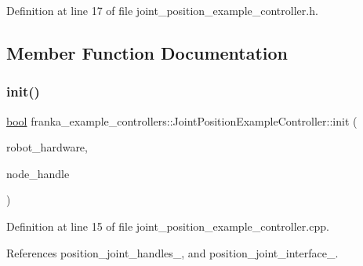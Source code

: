 Definition at line 17 of file joint\+\_\+position\+\_\+example\+\_\+controller.\+h.



\subsection{Member Function Documentation}
\mbox{\label{classfranka__example__controllers_1_1JointPositionExampleController_a958b27b475476717543b8cc107bd6c1b}} 
\subsubsection{\texorpdfstring{init()}{init()}}
{\footnotesize\ttfamily \hyperlink{classbool}{bool} franka\+\_\+example\+\_\+controllers\+::\+Joint\+Position\+Example\+Controller\+::init (\begin{DoxyParamCaption}\item[{hardware\+\_\+interface\+::\+Robot\+HW $\ast$}]{robot\+\_\+hardware,  }\item[{ros\+::\+Node\+Handle \&}]{node\+\_\+handle }\end{DoxyParamCaption})\hspace{0.3cm}{\ttfamily [override]}}



Definition at line 15 of file joint\+\_\+position\+\_\+example\+\_\+controller.\+cpp.



References position\+\_\+joint\+\_\+handles\+\_\+, and position\+\_\+joint\+\_\+interface\+\_\+.


